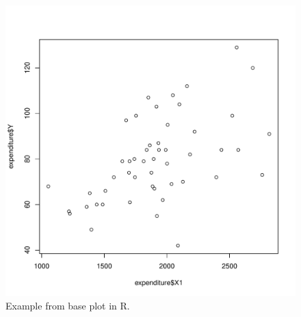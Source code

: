 \documentclass[12pt,letterpaper]{article}
\begin{document}
\begin{figure}[h!]\centering

	\caption{\footnotesize Example from base plot in R.}
		\label{fig:plot_1}
	\includegraphics[width=.85\textwidth]{plot_example.pdf}
\end{figure}
\end{document}
